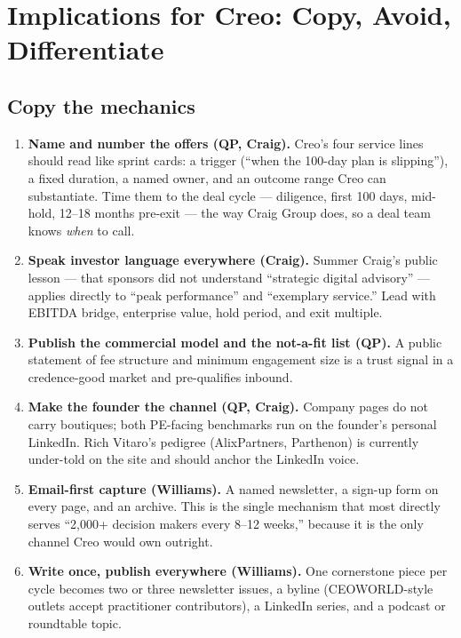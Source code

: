\documentclass[11pt]{article}
\begin{document}
\section{Implications for Creo: Copy, Avoid, Differentiate}

\subsection{Copy the mechanics}
\begin{enumerate}
  \item \textbf{Name and number the offers (QP, Craig).} Creo's four service lines
  should read like sprint cards: a trigger (``when the 100-day plan is slipping''), a
  fixed duration, a named owner, and an outcome range Creo can substantiate. Time them
  to the deal cycle --- diligence, first 100 days, mid-hold, 12--18 months pre-exit ---
  the way Craig Group does, so a deal team knows \emph{when} to call.
  \item \textbf{Speak investor language everywhere (Craig).} Summer Craig's public
  lesson --- that sponsors did not understand ``strategic digital advisory'' --- applies
  directly to ``peak performance'' and ``exemplary service.'' Lead with EBITDA bridge,
  enterprise value, hold period, and exit multiple.
  \item \textbf{Publish the commercial model and the not-a-fit list (QP).} A public
  statement of fee structure and minimum engagement size is a trust signal in a
  credence-good market and pre-qualifies inbound.
  \item \textbf{Make the founder the channel (QP, Craig).} Company pages do not carry
  boutiques; both PE-facing benchmarks run on the founder's personal LinkedIn.
  Rich Vitaro's pedigree (AlixPartners, Parthenon) is currently under-told on the site
  and should anchor the LinkedIn voice.
  \item \textbf{Email-first capture (Williams).} A named newsletter, a sign-up form on
  every page, and an archive. This is the single mechanism that most directly serves
  ``2,000+ decision makers every 8--12 weeks,'' because it is the only channel Creo
  would own outright.
  \item \textbf{Write once, publish everywhere (Williams).} One cornerstone piece per
  cycle becomes two or three newsletter issues, a byline (CEOWORLD-style outlets accept
  practitioner contributors), a LinkedIn series, and a podcast or roundtable topic.

\end{enumerate}
\end{document}
